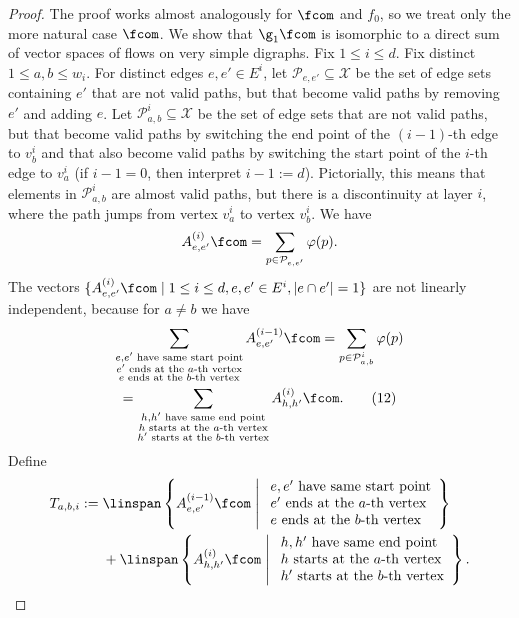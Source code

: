 \begin{proof}
The proof works almost analogously for $\fcom$ and $f_0$, so we treat only the more natural case $\fcom$. We show that $\g_1\fcom$ is isomorphic to a direct sum of vector spaces of flows on very simple digraphs. Fix $1\le i\le d$. Fix distinct $1\le a,b\le w_i$. For distinct edges $e,e'\in E^i$, let $\mathcal P_{e,e'}\subseteq\mathcal X$ be the set of edge sets containing $e'$ that are not valid paths, but that become valid paths by removing $e'$ and adding $e$. Let $\mathcal P^i_{a,b}\subseteq\mathcal X$ be the set of edge sets that are not valid paths, but that become valid paths by switching the end point of the $(i-1)$-th edge to $v_b^i$ and that also become valid paths by switching the start point of the $i$-th edge to $v_a^i$ (if $i-1=0$, then interpret $i-1:=d$). Pictorially, this means that elements in $\mathcal P^i_{a,b}$ are almost valid paths, but there is a discontinuity at layer $i$, where the path jumps from vertex $v_a^i$ to vertex $v_b^i$. We have
\[A^{(i)}_{e,e'}\fcom=\sum_{p\in\mathcal P_{e,e'}}\varphi(p).\]
The vectors $\{A^{(i)}_{e,e'}\fcom\mid1\le i\le d,e,e'\in E^i,|e\cap e'|=1\}$ are not linearly independent, because for $a\ne b$ we have
\begin{multline*}
\sum_{\substack{e,e'\text{ have same start point}\\e'\text{ ends at the }a\text{-th vertex}\\e\text{ ends at the }b\text{-th vertex}}}A^{(i-1)}_{e,e'}\fcom=\sum_{p\in\mathcal P^i_{a,b}}\varphi(p)\\
=\sum_{\substack{h,h'\text{ have same end point}\\h\text{ starts at the }a\text{-th vertex}\\h'\text{ starts at the }b\text{-th vertex}}}A^{(i)}_{h,h'}\fcom.\tag{12}\label{eq:dependency}
\end{multline*}
Define
\begin{align*}
T_{a,b,i}:={}&\linspan\left\{A^{(i-1)}_{e,e'}\fcom\;\middle|\;\begin{array}{l}e,e'\text{ have same start point}\\e'\text{ ends at the }a\text{-th vertex}\\e\text{ ends at the }b\text{-th vertex}\end{array}\right\}\\
&+\linspan\left\{A^{(i)}_{h,h'}\fcom\;\middle|\;\begin{array}{l}h,h'\text{ have same end point}\\h\text{ starts at the }a\text{-th vertex}\\h'\text{ starts at the }b\text{-th vertex}\end{array}\right\}.

\end{align*}
\end{proof}
